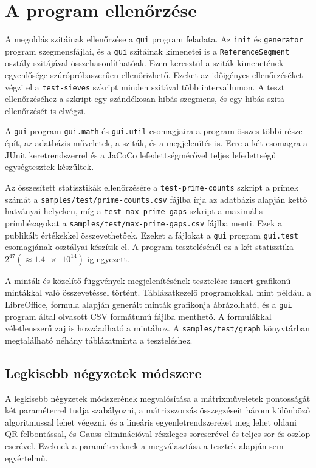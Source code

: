 \pagebreak
\section{A program ellenőrzése}

A megoldás szitáinak ellenőrzése a \texttt{gui} program feladata.
Az \texttt{init} és \texttt{generator} program szegmensfájlai, és a \texttt{gui} szitáinak kimenetei is a \texttt{ReferenceSegment} osztály szitájával összehasonlíthatóak.
Ezen keresztül a sziták kimenetének egyenlősége szúrópróbaszerűen ellenőrizhető.
Ezeket az időigényes ellenőrzéséket végzi el a \texttt{test-sieves} szkript minden szitával több intervallumon.
A teszt ellenőrzéséhez a szkript egy szándékosan hibás szegmens, és egy hibás szita ellenőrzését is elvégzi.

A \texttt{gui} program \texttt{gui.math} és \texttt{gui.util} csomagjaira a program összes többi része épít, az adatbázis műveletek, a sziták, és a megjelenítés is. Erre a két csomagra a \mbox{JUnit} keretrendszerrel és a JaCoCo lefedettségmérővel teljes lefedettségű egységtesztek készültek.

Az összesített statisztikák ellenőrzésére a \texttt{test-prime-counts} szkript a prímek számát a \texttt{samples/test/prime-counts.csv} fájlba írja az adatbázis alapján kettő hatványai helyeken, míg a \texttt{test-max-prime-gaps} szkript a maximális prímhézagokat a \texttt{samples/test/max-prime-gaps.csv} fájlba menti.
Ezek a publikált értékekkel\cite{gaps}\cite{pi} összevethetőek.
Ezeket a fájlokat a \texttt{gui} program \texttt{gui.test} csomagjának osztályai készítik el.
A program tesztelésénél ez a két statisztika $2^{47}(\approx \num{1,4e14})$-ig egyezett.

A minták és közelítő függvények megjelenítésének tesztelése ismert grafikonú mintákkal való összevetéssel történt.
Táblázatkezelő programokkal, mint például a LibreOffice, formula alapján generált minták grafikonja ábrázolható, és a \texttt{gui} program által olvasott CSV formátumú fájlba menthető.
A formulákkal véletlenszerű zaj is hozzáadható a mintához.
A \texttt{samples/test/graph} könyvtárban megtalálható néhány táblázatminta a teszteléshez.

\subsection{Legkisebb négyzetek módszere}

A legkisebb négyzetek módszerének megvalósítása a mátrixműveletek pontosságát két paraméterrel tudja szabályozni, a mátrixszorzás összegzéseit három különböző algoritmussal lehet végezni, és a lineáris egyenletrendszereket meg lehet oldani QR felbontással, és Gauss-eliminációval részleges sorcserével és teljes sor és oszlop cserével.
Ezeknek a paramétereknek a megválasztása a tesztek alapján sem egyértelmű.

